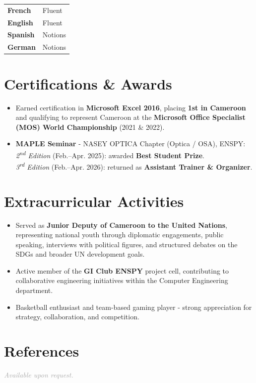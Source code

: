 \documentclass[10pt, a4paper]{article}
\begin{document}
\vspace{2pt}
\noindent
\begin{tabularx}{\linewidth}{@{} >{\bfseries}p{4.8cm} X @{}}
  French   & Fluent \\[3pt]
  English  & Fluent \\[3pt]
  Spanish  & Notions \\[3pt]
  German   & Notions \\
\end{tabularx}

\section{Certifications \& Awards}

\begin{itemize}
  \item Earned certification in
        \textbf{Microsoft Excel 2016}, placing \textbf{1st in Cameroon} and
        qualifying to represent Cameroon at the \textbf{Microsoft Office Specialist (MOS)
        World Championship} (2021 \& 2022).
  \item \textbf{MAPLE Seminar} - NASEY OPTICA Chapter (Optica / OSA), ENSPY:\\
        \textit{2\textsuperscript{nd} Edition} (Feb.--Apr. 2025): awarded \textbf{Best Student Prize}.\\
        \textit{3\textsuperscript{rd} Edition} (Feb.--Apr. 2026): returned as
        \textbf{Assistant Trainer \& Organizer}.
\end{itemize}

\section{Extracurricular Activities}

\begin{itemize}
  \item Served as \textbf{Junior Deputy of Cameroon to the United Nations}, representing national
        youth through diplomatic engagements, public speaking, interviews with political figures,
        and structured debates on the SDGs and broader UN development goals.
  \item Active member of the \textbf{GI Club ENSPY} project cell, contributing to collaborative
        engineering initiatives within the Computer Engineering department.
  \item Basketball enthusiast and team-based gaming player - strong appreciation for
        strategy, collaboration, and competition.
\end{itemize}

\section{References}

\textit{\textcolor{darkgray}{Available upon request.}}
\end{document}
